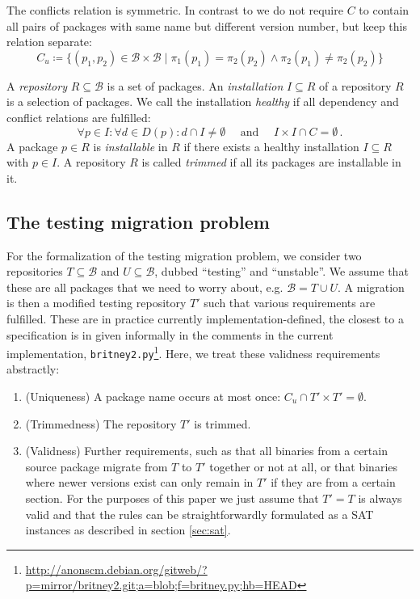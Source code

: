 \documentclass[halfparskip,11pt]{scrartcl}
\begin{document}
The conflicts relation is symmetric. In contrast to \cite{edos} we do not require $C$ to contain all pairs of packages with same name but different version number, but keep this relation separate:
\[
C_u \coloneqq \{(p_1,p_2) \in \mathcal B\times\mathcal B \mid \pi_1(p_1)=\pi_2(p_2) \wedge \pi_2(p_1) \ne \pi_2(p_2)\}
\]

A \emph{repository} $R\subseteq \mathcal B$ is a set of packages. An \emph{installation} $I\subseteq R$ of a repository $R$ is a selection of packages. We call the installation \emph{healthy} if all dependency and conflict relations are fulfilled: 
\[
\forall p\in I\colon  \forall d\in D(p)\colon d \cap I\ne\emptyset
\quad\text{ and }\quad
I \times I \cap C = \emptyset\,.
\]
A package $p\in R$ is \emph{installable} in $R$ if there exists a healthy installation $I\subseteq R$ with $p\in I$. A repository $R$ is called \emph{trimmed} if all its packages are installable in it.

\subsection{The testing migration problem}
\label{testmigdef}

For the formalization of the testing migration problem, we consider two repositories $T\subseteq\mathcal B$ and $U\subseteq\mathcal B$, dubbed “testing” and “unstable”. We assume that these are all packages that we need to worry about, e.g. $\mathcal B = T\cup U$. A migration is then a mo\-di\-fied testing repository $T'$ such that various requirements are fulfilled. These are in practice currently implementation-defined, the closest to a specification is in given informally in the comments in the current implementation, \texttt{britney2.py}\footnote{\url{http://anonscm.debian.org/gitweb/?p=mirror/britney2.git;a=blob;f=britney.py;hb=HEAD}}. Here, we treat these validness requirements abstractly:

\begin{enumerate}
\item (Uniqueness) A package name occurs at most once: $C_u \cap T'\times T' = \emptyset$.
\item (Trimmedness) The repository $T'$ is trimmed.
\item (Validness) Further requirements, such as that all binaries from a certain source package migrate from $T$ to $T'$ together or not at all, or that binaries where newer versions exist can only remain in $T'$ if they are from a certain section. For the purposes of this paper we just assume that $T'=T$ is always valid and that the rules can be straightforwardly formulated as a SAT instances as described in section \ref{sec:sat}.
\end{enumerate}
\end{document}
